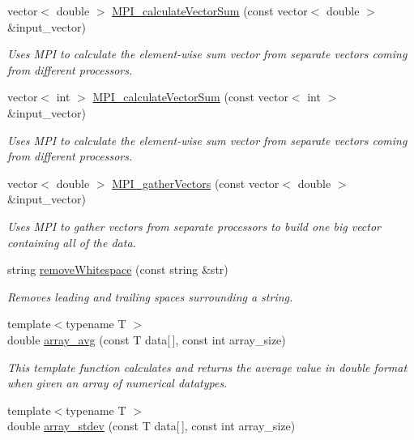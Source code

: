 \begin{DoxyCompactItemize}
vector$<$ double $>$ \hyperlink{namespace_utils_ae42867cb7be2aca3ff23e27a94c4f68b}{M\+P\+I\+\_\+calculate\+Vector\+Sum} (const vector$<$ double $>$ \&input\+\_\+vector)
\begin{DoxyCompactList}\small\item\em Uses M\+PI to calculate the element-\/wise sum vector from separate vectors coming from different processors. \end{DoxyCompactList}\item 
vector$<$ int $>$ \hyperlink{namespace_utils_a07efe2f58beb35b78d295a0b0dc1f660}{M\+P\+I\+\_\+calculate\+Vector\+Sum} (const vector$<$ int $>$ \&input\+\_\+vector)
\begin{DoxyCompactList}\small\item\em Uses M\+PI to calculate the element-\/wise sum vector from separate vectors coming from different processors. \end{DoxyCompactList}\item 
vector$<$ double $>$ \hyperlink{namespace_utils_af9a7e13279f18cd8d36ca98a7943a7e8}{M\+P\+I\+\_\+gather\+Vectors} (const vector$<$ double $>$ \&input\+\_\+vector)
\begin{DoxyCompactList}\small\item\em Uses M\+PI to gather vectors from separate processors to build one big vector containing all of the data. \end{DoxyCompactList}\item 
string \hyperlink{namespace_utils_aaa3265ae19d2fbd675a9d47d46f62b11}{remove\+Whitespace} (const string \&str)
\begin{DoxyCompactList}\small\item\em Removes leading and trailing spaces surrounding a string. \end{DoxyCompactList}\item 
{\footnotesize template$<$typename T $>$ }\\double \hyperlink{namespace_utils_aa76a204af4dd4c3eb151691825de2eb2}{array\+\_\+avg} (const T data\mbox{[}$\,$\mbox{]}, const int array\+\_\+size)
\begin{DoxyCompactList}\small\item\em This template function calculates and returns the average value in double format when given an array of numerical datatypes. \end{DoxyCompactList}\item 
{\footnotesize template$<$typename T $>$ }\\double \hyperlink{namespace_utils_a25d09c704b5ae03f01cf76b6de10aa19}{array\+\_\+stdev} (const T data\mbox{[}$\,$\mbox{]}, const int array\+\_\+size)

\end{DoxyCompactItemize}
